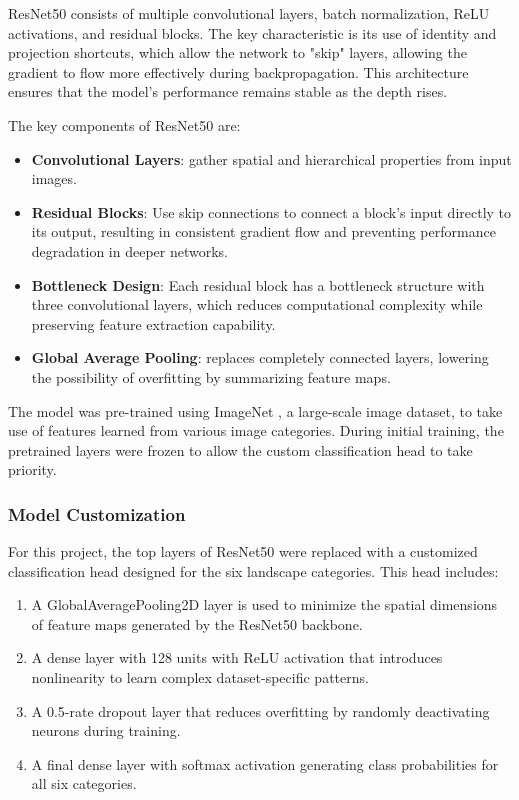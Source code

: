 \documentclass[conference]{IEEEtran}
\begin{document}
ResNet50 consists of multiple convolutional layers, batch normalization, ReLU activations, and residual blocks. The key characteristic is its use of identity and projection shortcuts, which allow the network to "skip" layers, allowing the gradient to flow more effectively during backpropagation. This architecture ensures that the model's performance remains stable as the depth rises.

The key components of ResNet50 are:

\begin{itemize}
    \item \textbf{Convolutional Layers}: gather spatial and hierarchical properties from input images.
    \item  \textbf{Residual Blocks}: Use skip connections to connect a block's input directly to its output, resulting in consistent gradient flow and preventing performance degradation in deeper networks.

    \item \textbf{Bottleneck Design}: Each residual block has a bottleneck structure with three convolutional layers, which reduces computational complexity while preserving feature extraction capability.
    \item \textbf{Global Average Pooling}: replaces completely connected layers, lowering the possibility of overfitting by summarizing feature maps.
\end{itemize}
   
The model was pre-trained using ImageNet \cite{imagenet}, a large-scale image dataset, to take use of features learned from various image categories. During initial training, the pretrained layers were frozen to allow the custom classification head to take priority.


\subsubsection{Model Customization}
For this project, the top layers of ResNet50 were replaced with a customized classification head designed for the six landscape categories. This head includes:

\begin{enumerate}
    \item A GlobalAveragePooling2D layer is used to minimize the spatial dimensions of feature maps generated by the ResNet50 backbone. 
    \item A dense layer with 128 units with ReLU activation that introduces nonlinearity to learn complex dataset-specific patterns.
    \item A 0.5-rate dropout layer that reduces overfitting by randomly deactivating neurons during training.
    \item A final dense layer with softmax activation generating class probabilities for all six categories.
\end{enumerate}
\end{document}
